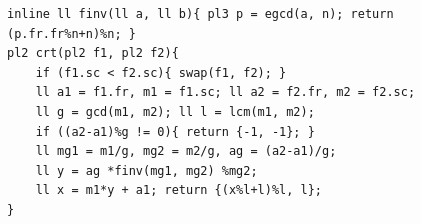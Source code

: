 \begin{verbatim}
inline ll finv(ll a, ll b){ pl3 p = egcd(a, n); return (p.fr.fr%n+n)%n; }
pl2 crt(pl2 f1, pl2 f2){
	if (f1.sc < f2.sc){ swap(f1, f2); }
	ll a1 = f1.fr, m1 = f1.sc; ll a2 = f2.fr, m2 = f2.sc;
	ll g = gcd(m1, m2); ll l = lcm(m1, m2);
	if ((a2-a1)%g != 0){ return {-1, -1}; }
	ll mg1 = m1/g, mg2 = m2/g, ag = (a2-a1)/g;
	ll y = ag *finv(mg1, mg2) %mg2;
	ll x = m1*y + a1; return {(x%l+l)%l, l};
}
\end{verbatim}
